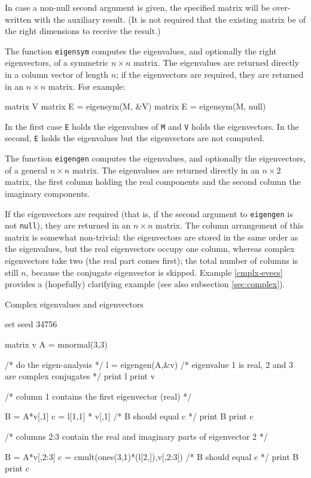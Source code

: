 In case a non-null second argument is given, the specified matrix will
be over-written with the auxiliary result.  (It is not required that
the existing matrix be of the right dimensions to receive the result.)

The function \texttt{eigensym} computes the eigenvalues, and
optionally the right eigenvectors, of a symmetric $n \times n$ matrix.
The eigenvalues are returned directly in a column vector of length
$n$; if the eigenvectors are required, they are returned in an $n
\times n$ matrix.  For example:
%
\begin{code}
matrix V
matrix E = eigensym(M, &V)
matrix E = eigensym(M, null)
\end{code}
%
In the first case \texttt{E} holds the eigenvalues of \texttt{M} and
\texttt{V} holds the eigenvectors.  In the second, \texttt{E} holds
the eigenvalues but the eigenvectors are not computed.

The function \texttt{eigengen} computes the eigenvalues, and
optionally the eigenvectors, of a general $n \times n$ matrix.  The
eigenvalues are returned directly in an $n \times 2$ matrix, the first
column holding the real components and the second column the imaginary
components.  

If the eigenvectors are required (that is, if the second argument to
\texttt{eigengen} is not \texttt{null}), they are returned in an $n
\times n$ matrix. The column arrangement of this matrix is somewhat
non-trivial: the eigenvectors are stored in the same order as the
eigenvalues, but the real eigenvectors occupy one column, whereas
complex eigenvectors take two (the real part comes first); the total
number of columns is still $n$, because the conjugate eigenvector is
skipped. Example \ref{cmplx-evecs} provides a (hopefully) clarifying
example (see also subsection \ref{sec:complex}).

\begin{script}[htbp]
  \caption{Complex eigenvalues and eigenvectors}
  \label{cmplx-evecs}
\begin{scode}
set seed 34756

matrix v
A = mnormal(3,3)

/* do the eigen-analysis */
l = eigengen(A,&v)
/* eigenvalue 1 is real, 2 and 3 are complex conjugates */
print l
print v

/* 
  column 1 contains the first eigenvector (real)
*/

B = A*v[,1]
c = l[1,1] * v[,1]
/* B should equal c */
print B
print c


/* 
  columns 2:3 contain the real and imaginary parts
  of eigenvector 2
*/

B = A*v[,2:3]
c = cmult(ones(3,1)*(l[2,]),v[,2:3])
/* B should equal c */
print B
print c
\end{scode}
\end{script}

